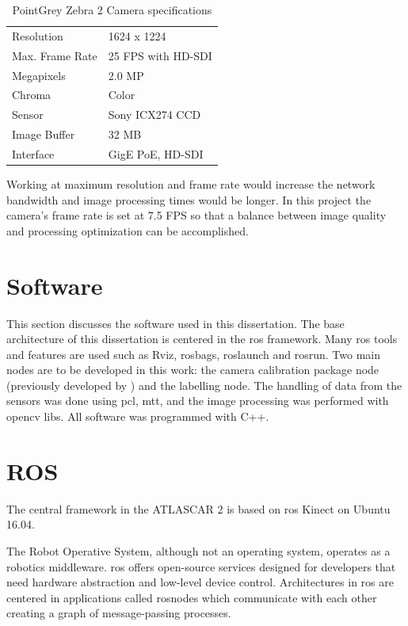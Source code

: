 \begin{table}[!h]
	\centering
	\caption{PointGrey Zebra 2 Camera specifications}
	\label{tab: pointgreyspecs}
	\begin{tabular}{ll}
		
		\hline
		Resolution & 1624 x 1224\\
		Max. Frame Rate & 25 FPS with HD-SDI \\
		Megapixels & 2.0 MP \\
		Chroma & Color\\
		Sensor & Sony ICX274 CCD \\
		Image Buffer &	32 MB\\
		Interface &	GigE PoE, HD-SDI\\
		
		\hline
	\end{tabular}
\end{table}

Working at maximum resolution and frame rate would increase the network bandwidth and image processing times would be longer. In this project the camera's frame rate is set at 7.5 FPS so that a balance between image quality and processing optimization can be accomplished.


\section{Software}

This section discusses the software used in this dissertation. The base architecture of this dissertation is centered in the \gls{ros} framework. Many \gls{ros} tools and features are used such as Rviz, rosbags, roslaunch and rosrun. Two main nodes are to be developed in this work: the camera calibration package node (previously developed by \cite{VieiradaSilva2016}) and the labelling node. The handling of data from the sensors was done using \gls{pcl}, \gls{mtt}, 
and the image processing was performed with \gls{opencv} libs. All software was programmed with C++.

\section{ROS}
The central framework in the ATLASCAR 2 is based on \gls{ros} Kinect on Ubuntu 16.04.

The Robot Operative System, although not an operating system, operates as a robotics middleware. \gls{ros} offers open-source services designed for developers that need hardware abstraction and low-level device control. Architectures in \gls{ros} are centered in applications called rosnodes which communicate with each other creating a graph of  message-passing processes. 

